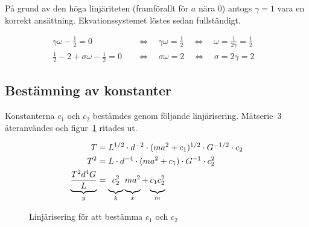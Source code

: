 \documentclass[a4paper,12pt]{article}
\begin{document}
På grund av den höga linjäriteten (framförallt för $a$ nära 0) antogs $\gamma = 1$
vara en korrekt ansättning. Ekvationssystemet löstes sedan fullständigt.

\begin{align}
  \gamma\omega - \frac{1}{2} = 0 \quad &\Leftrightarrow \quad \gamma\omega = \frac{1}{2} \quad \Leftrightarrow \quad \omega = \frac{1}{2\gamma} = \frac{1}{2} & \\[0.5em]
  \frac{1}{2} - 2 + \sigma\omega - \frac{1}{2} = 0 \quad &\Leftrightarrow \quad \sigma\omega = 2 \quad \Leftrightarrow \quad \sigma = 2\gamma = 2 &
\end{align}

\subsection{Bestämning av konstanter}

Konstanterna $c_1$ och $c_2$ bestämdes genom följande linjärisering.
Mätserie~3 återanvändes och figur~\ref{fig:lin_c1_c2} ritades ut.

\begin{align}
  T &= L^{1/2} \cdot d^{-2} \cdot (m a^2 + c_1)^{1/2} \cdot G^{-1/2} \cdot c_2 \nonumber \\
  T^2 &= L \cdot d^{-4} \cdot (m a^2 + c_1) \cdot G^{-1} \cdot c_2^2 \nonumber \\
  \underbrace{\frac{T^2 d^4 G}{L}}_y &= \underbrace{c_2^2 \vphantom{\frac{T^2 d^4 G}{L}}}_k \underbrace{m a^2 \vphantom{\frac{T^2 d^4 G}{L}}}_x + \underbrace{c_1c_2^2 \vphantom{\frac{T^2 d^4 G}{L}}}_m
\end{align}

\begin{figure}[h!]
  \caption{Linjärisering för att bestämma $c_1$ och $c_2$}
  \label{fig:lin_c1_c2}
\end{figure}
\end{document}
